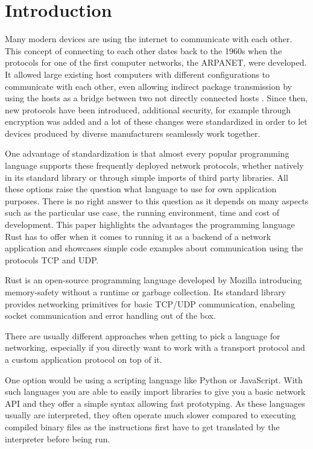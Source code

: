 
\section{Introduction} \label{introduction}
Many modern devices are using the internet to communicate with each other. This concept of connecting to each other
dates back to the 1960s when the protocols for one of the first computer networks, the ARPANET, were developed. It
allowed large existing host computers with different configurations to communicate with each other, even allowing
indirect package transmission by using the hosts as a bridge between two not directly connected hosts \cite{f70arpa}.
Since then, new protocols have been introduced, additional security, for example through encryption was added and a lot
of these changes were standardized in order to let devices produced by diverse manufacturers seamlessly work together.

One advantage of standardization is that almost every popular programming language supports these frequently deployed
network protocols, whether natively in its standard library or through simple imports of third party libraries. All
these options raise the question what language to use for own application purposes. There is no right answer to this
question as it depends on many aspects such as the particular use case, the running environment, time and cost of
development. This paper highlights the advantages the programming language Rust has to offer when it comes to running
it as a backend of a network application and showcases simple code examples about communication using the protocols TCP
and UDP.

Rust is an open-source programming language developed by Mozilla introducing memory-safety without a runtime or garbage
collection. Its standard library provides networking primitives for basic TCP/UDP communication, enabeling socket
communication and error handling out of the box. \cite{rust-language}

There are usually different approaches when getting to pick a language for networking, especially if you directly want
to work with a transport protocol and a custom application protocol on top of it.

One option would be using a scripting language like Python or JavaScript. With such languages you are able to easily
import libraries to give you a basic network API and they offer a simple syntax allowing fast prototyping. As these
languages usually are interpreted, they often operate much slower compared to executing compiled binary files as the
instructions first have to get translated by the interpreter before being run.

